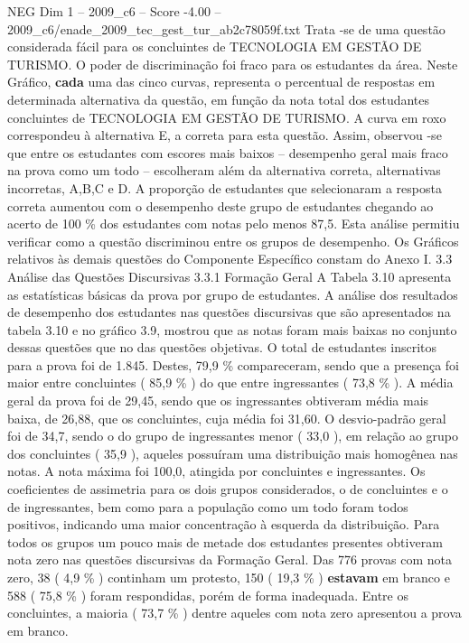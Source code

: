\begin{textsample}{NEG Dim 1 – 2009\_c6 – Score -4.00 – 2009\_c6/enade\_2009\_tec\_gest\_tur\_ab2c78059f.txt}
Trata -se de uma questão considerada fácil para os concluintes de TECNOLOGIA EM GESTÃO DE TURISMO.
O poder de discriminação foi fraco para os estudantes da área.
Neste Gráfico, \textbf{cada} uma das cinco curvas, representa o percentual de respostas em determinada alternativa da questão, em função da nota total dos estudantes concluintes de TECNOLOGIA EM GESTÃO DE TURISMO.
A curva em roxo correspondeu à alternativa E, a correta para esta questão.
Assim, observou -se que entre os estudantes com escores mais baixos – desempenho geral mais fraco na prova como um todo – escolheram além da alternativa correta, alternativas incorretas, A,B,C e D.
A proporção de estudantes que selecionaram a resposta correta aumentou com o desempenho deste grupo de estudantes chegando ao acerto de 100 \% dos estudantes com notas pelo menos 87,5.
Esta análise permitiu verificar como a questão discriminou entre os grupos de desempenho.
Os Gráficos relativos às demais questões do Componente Específico constam do Anexo I. 3.3 Análise das Questões Discursivas 3.3.1 Formação Geral A Tabela 3.10 apresenta as estatísticas básicas da prova por grupo de estudantes.
A análise dos resultados de desempenho dos estudantes nas questões discursivas que são apresentados na tabela 3.10 e no gráfico 3.9, mostrou que as notas foram mais baixas no conjunto dessas questões que no das questões objetivas.
O total de estudantes inscritos para a prova foi de 1.845.
Destes, 79,9 \% compareceram, sendo que a presença foi maior entre concluintes ( 85,9 \% ) do que entre ingressantes ( 73,8 \% ).
A média geral da prova foi de 29,45, sendo que os ingressantes obtiveram média mais baixa, de 26,88, que os concluintes, cuja média foi 31,60.
O desvio-padrão geral foi de 34,7, sendo o do grupo de ingressantes menor ( 33,0 ), em relação ao grupo dos concluintes ( 35,9 ), aqueles possuíram uma distribuição mais homogênea nas notas.
A nota máxima foi 100,0, atingida por concluintes e ingressantes.
Os coeficientes de assimetria para os dois grupos considerados, o de concluintes e o de ingressantes, bem como para a população como um todo foram todos positivos, indicando uma maior concentração à esquerda da distribuição.
Para todos os grupos um pouco mais de metade dos estudantes presentes obtiveram nota zero nas questões discursivas da Formação Geral.
Das 776 provas com nota zero, 38 ( 4,9 \% ) continham um protesto, 150 ( 19,3 \% ) \textbf{estavam} em branco e 588 ( 75,8 \% ) foram respondidas, porém de forma inadequada.
Entre os concluintes, a maioria ( 73,7 \% ) dentre aqueles com nota zero apresentou a prova em branco.

\end{textsample}
